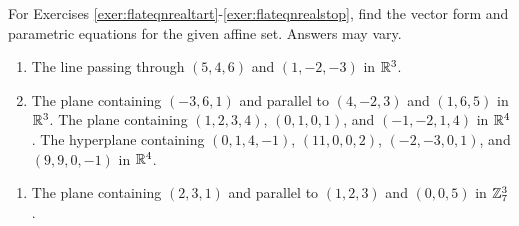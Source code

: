 \noindent For Exercises \ref{exer:flateqnrealtart}-\ref{exer:flateqnrealstop}, find the vector form and parametric equations for the given affine set. Answers may vary.
\begin{enumerate}[!HW!]
\item\label{exer:flateqnrealtart}\label{exer:chanceline} The line passing through $(5,4,6)$ and $(1,-2,-3)$ in $\mathbb{R}^3$. %
\item  The plane containing $(-3,6,1)$ and parallel to $(4,-2,3)$ and $(1,6,5)$ in $\mathbb{R}^3$. %
\itemspade \label{exer:chanceplane}The plane containing $(1,2,3,4)$, $(0,1,0,1)$, and $(-1,-2,1,4)$ in $\mathbb{R}^4$.
\itemspade The hyperplane containing $(0,1,4,-1)$, $(11,0,0,2)$, $(-2,-3,0,1)$, and $(9,9,0,-1)$ in $\mathbb{R}^4$.
\end{enumerate}
\begin{enumerate}[!HW!,label=$\spadesuit$ \arabic*., ref=\arabic*]
\itemspade The line containing $(i,1+2i)$ and parallel to the vector $(2-i, 5)$ in $\C^2$.
\itemspade
The line passing through $(1,2,3)$ and $(0,1,3)$ in $\Z_5^3$.
\item%
\label{exer:flateqnrealstop} The plane containing $(2,3,1)$ and parallel to $(1,2,3)$ and $(0,0,5)$ in $\mathbb{Z}_7^3$.
\end{enumerate}

